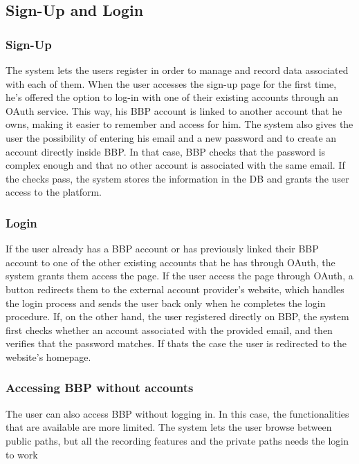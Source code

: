 \subsection*{Sign-Up and Login}
\subsubsection*{Sign-Up}
The system lets the users register in order to manage and record data associated with each of them. When the user accesses the sign-up page for the first time, he’s offered the option to log-in with one of their existing accounts through an OAuth service. This way, his BBP account is linked to another account that he owns, making it easier to remember and access for him. 
The system also gives the user the possibility of entering his email and a new password and to create an account directly inside BBP. In that case, BBP checks that the password is complex enough and that no other account is associated with the same email. If the checks pass, the system stores the information in the DB and grants the user access to the platform.
\subsubsection*{Login}
If the user already has a BBP account or has previously linked their BBP account to one of the other existing accounts that he has through OAuth, the system grants them access the page. If the user access the page through OAuth, a button redirects them to the external account provider’s website, which handles the login process and sends the user back only when he completes the login procedure. If, on the other hand, the user registered directly on BBP, the system first checks whether an account associated with the provided email, and then verifies that the password matches. If thats the case the user is redirected to the website’s homepage.
\subsubsection*{Accessing BBP without accounts}
The user can also access BBP without logging in. In this case, the functionalities that are available are more limited. The system lets the user browse between public paths, but all the recording features and the private paths needs the login to work






